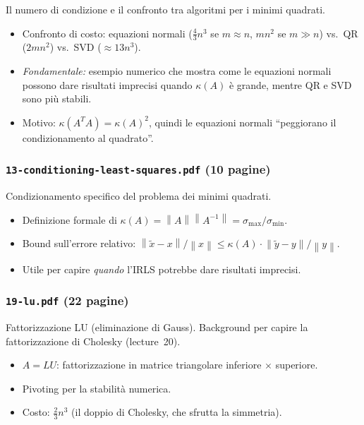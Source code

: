 \documentclass[a4paper,11pt]{article}
\theoremstyle{definition}
\newcommand{\norm}[1]{\left\lVert #1 \right\rVert}
\begin{document}
Il numero di condizione e il confronto tra algoritmi per i minimi quadrati.

\begin{itemize}
  \item Confronto di costo: equazioni normali ($\frac{4}{3}n^3$ se $m \approx n$, $mn^2$ se $m \gg n$) vs.\ QR ($2mn^2$) vs.\ SVD ($\approx 13n^3$).
  \item \emph{Fondamentale:} esempio numerico che mostra come le equazioni normali possono dare risultati imprecisi quando $\kappa(A)$ è grande, mentre QR e SVD sono più stabili.
  \item Motivo: $\kappa(A^TA) = \kappa(A)^2$, quindi le equazioni normali ``peggiorano il condizionamento al quadrato''.
\end{itemize}

\subsubsection*{ \quad \texttt{13-conditioning-least-squares.pdf} (10 pagine)}

Condizionamento specifico del problema dei minimi quadrati.

\begin{itemize}
  \item Definizione formale di $\kappa(A) = \norm{A}\norm{A^{-1}} = \sigma_{\max}/\sigma_{\min}$.
  \item Bound sull'errore relativo: $\norm{\tilde{x}-x}/\norm{x} \leq \kappa(A) \cdot \norm{\tilde{y}-y}/\norm{y}$.
  \item Utile per capire \emph{quando} l'IRLS potrebbe dare risultati imprecisi.
\end{itemize}

\subsubsection*{ \quad \texttt{19-lu.pdf} (22 pagine)}

Fattorizzazione LU (eliminazione di Gauss). Background per capire la fattorizzazione di Cholesky (lecture~20).

\begin{itemize}
  \item $A = LU$: fattorizzazione in matrice triangolare inferiore $\times$ superiore.
  \item Pivoting per la stabilità numerica.
  \item Costo: $\frac{2}{3}n^3$ (il doppio di Cholesky, che sfrutta la simmetria).
\end{itemize}
\end{document}
